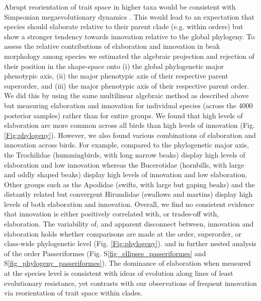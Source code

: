 \documentclass[12pt,letterpaper]{article}
\begin{document}
Abrupt reorientation of trait space in higher taxa would be consistent with Simpsonian megaevolutionary dynamics \cite{simpson1953major}.
This would lead to an expectation that species should elaborate relative to their parent clade (e.g. within orders) but show a stronger tendency towards innovation relative to the global phylogeny.
To assess the relative contributions of elaboration and innovation in beak morphology among species we estimated the algebraic projection and rejection of their position in the shape-space onto (i) the global phylogenetic major phenotypic axis, (ii) the major phenotypic axis of their respective parent superorder, and (iii) the major phenotypic axis of their respective parent order.
We did this by using the same multilinear algebraic method as described above but measuring elaboration and innovation for individual species (across the 4000 posterior samples) rather than for entire groups.
We found that high levels of elaboration are more common across all birds than high levels of innovation (Fig. \ref{Fig:phylogeny}).
However, we also found various combinations of elaboration and innovation across birds.
For example, compared to the phylogenetic major axis, the Trochilidae (hummingbirds, with long narrow beaks) display high levels of elaboration and low innovation whereas the Bucerotidae (hornbills, with large and oddly shaped beaks) display high levels of innovation and low elaboration.
Other groups such as the Apodidae (swifts, with large but gaping beaks) and the distantly related but convergent Hirundidae (swallows and martins) display high levels of both elaboration and innovation.
Overall, we find no consistent evidence that innovation is either positively correlated with, or trades-off with, elaboration. %
The variability of, and apparent disconnect between, innovation and elaboration holds whether comparisons are made at the order, superorder, or class-wide phylogenetic level (Fig. \ref{Fig:phylogeny}). %
 and in further nested analysis of the order Passeriformes (Fig. S\ref{fig_ellipses_passeriformes} and S\ref{fig_phylogeny_passeriformes}).
The dominance of elaboration when measured at the species level is consistent with ideas of evolution along lines of least evolutionary resistance, yet contrasts with our observations of frequent innovation via reorientation of trait space within clades.
\end{document}
